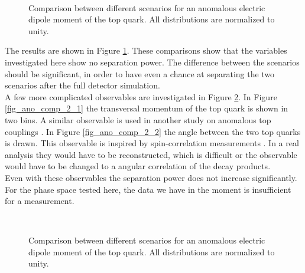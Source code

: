 \begin{figure}
  \\
  \caption{Comparison between different scenarios for an anomalous electric dipole moment of the top quark. All distributions are normalized to unity.}
  \label{fig_ano_comp_1}
\end{figure}

The results are shown in Figure \ref{fig_ano_comp_1}. These comparisons show that the variables investigated here show no separation power.  The difference between the scenarios should be significant, in order to have even a chance at separating the two scenarios after the full detector simulation.\\
A few more complicated observables are investigated in Figure \ref{fig_ano_comp_2}. In Figure \ref{fig_ano_comp_2_1} the transversal momentum of the top quark is shown in two bins. A similar observable is used in another study on anomalous top couplings . In Figure \ref{fig_ano_comp_2_2} the angle between the two top quarks is drawn. This observable is inspired by spin-correlation measurements \cite{CMS-PAS-TOP-12-004} \cite{Höhle:1349025}. In a real analysis they would have to be reconstructed, which is difficult or the observable would have to be changed to a angular correlation of the decay products.\\
Even with these observables the separation power does not increase significantly. For the phase space tested here, the data we have in the moment is insufficient for a measurement.   

\begin{figure}
  \\
  \caption{Comparison between different scenarios for an anomalous electric dipole moment of the top quark. All distributions are normalized to unity.}
  \label{fig_ano_comp_2}
\end{figure}

